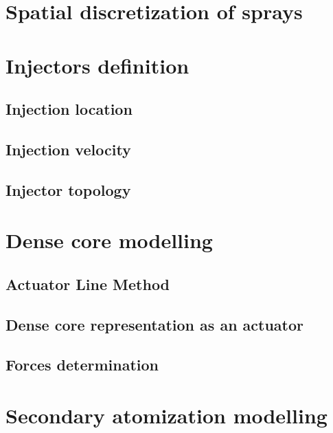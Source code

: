 \section{Spatial discretization of sprays}

\section{Injectors definition}

\subsection{Injection location}

\subsection{Injection velocity}

\subsection{Injector topology}



\section{Dense core modelling}
	\label{sec:dense_core_modelling}
	

\subsection{Actuator Line Method}



\subsection{Dense core representation as an actuator}



\subsection{Forces determination}



\section{Secondary atomization modelling}



